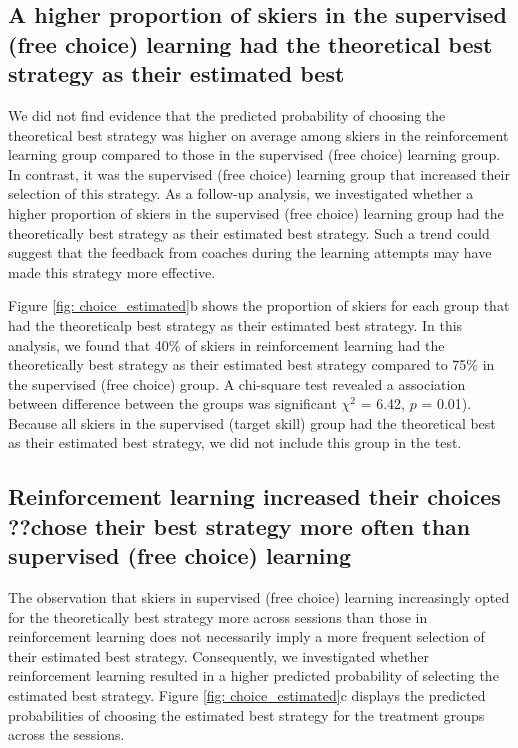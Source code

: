\documentclass[pdflatex,sn-mathphys-num]{sn-jnl}%
\theoremstyle{thmstyleone}%
\theoremstyle{thmstyletwo}%
\theoremstyle{thmstylethree}%
\begin{document}
\subsection{A higher proportion of skiers in the supervised (free choice) learning had the theoretical best strategy as their estimated best}\label{subsubsec3}
We did not find evidence that the predicted probability of choosing the theoretical best strategy was higher on average among skiers in the reinforcement learning group compared to those in the supervised (free choice) learning group. In contrast, it was the supervised (free choice) learning group that increased their selection of this strategy. As a follow-up analysis, we investigated whether a higher proportion of skiers in the supervised (free choice) learning group had the theoretically best strategy as their estimated best strategy. Such a trend could suggest that the feedback from coaches during the learning attempts may have made this strategy more effective. 

Figure \ref{fig: choice_estimated}b shows the proportion of skiers for each group that had the theoreticalp best strategy as their estimated best strategy. In this analysis, we found that 40\% of skiers in reinforcement learning had the theoretically best strategy as their estimated best strategy compared to 75\% in the supervised (free choice) group. A chi-square test revealed a association between difference between the groups was significant $\chi^2$ = 6.42, $p$ = 0.01). Because all skiers in the supervised (target skill) group had the theoretical best as their estimated best strategy, we did not include this group in the test.  


\subsection{Reinforcement learning increased their choices ??chose their best strategy more often than supervised (free choice) learning}\label{subsubsec3}
The observation that skiers in supervised (free choice) learning increasingly opted for the theoretically best strategy more across sessions than those in reinforcement learning does not necessarily imply a more frequent selection of their estimated best strategy. Consequently, we investigated whether reinforcement learning resulted in a higher predicted probability of selecting the estimated best strategy. Figure \ref{fig: choice_estimated}c displays the predicted probabilities of choosing the estimated best strategy for the treatment groups across the sessions. 
\end{document}
